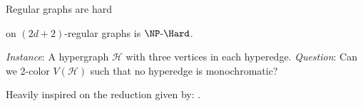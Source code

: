 \begin{frame}{Regular graphs are hard}
    \begin{theorem}
         on $(2d+2)$-regular graphs is $\NPH$.
    \end{theorem}
    \pause
    \begin{block}{}
        \textit{Instance}: A hypergraph $\mathcal{H}$ with three vertices in each hyperedge.
        \textit{Question}: Can we 2-color $V(\mathcal{H})$ such that no hyperedge is monochromatic?
    \end{block}
    \pause
    \begin{block}{}
        Heavily inspired on the reduction given by:  .
    \end{block}
\end{frame}

